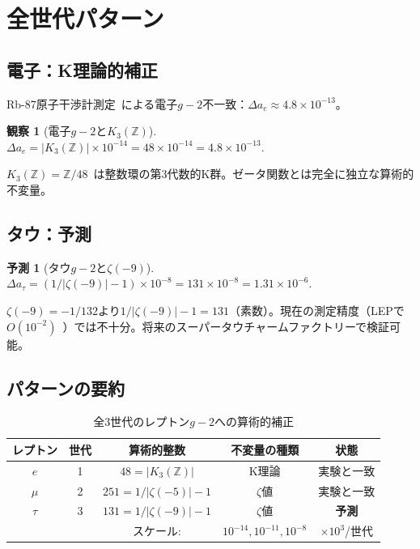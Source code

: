 \documentclass[11pt,a4paper]{article}
\newtheorem{observation}[theorem]{観察}
\newtheorem{prediction}[theorem]{予測}
\begin{document}
\section{全世代パターン}

\subsection{電子：K理論的補正}

Rb-87原子干渉計測定~\cite{Morel2020}による電子$g-2$不一致：$\Delta a_e \approx 4.8 \times 10^{-13}$。

\begin{observation}[電子$g-2$と$K_3(\mathbb{Z})$]
$\Delta a_e = |K_3(\mathbb{Z})| \times 10^{-14} = 48 \times 10^{-14} = 4.8 \times 10^{-13}.$
\end{observation}

$K_3(\mathbb{Z}) = \mathbb{Z}/48$~\cite{Lee1969}は整数環の第3代数的K群。ゼータ関数とは完全に独立な算術的不変量。

\subsection{タウ：予測}

\begin{prediction}[タウ$g-2$と$\zeta(-9)$]
$\Delta a_\tau = (1/|\zeta(-9)| - 1) \times 10^{-8} = 131 \times 10^{-8} = 1.31 \times 10^{-6}.$
\end{prediction}

$\zeta(-9) = -1/132$より$1/|\zeta(-9)| - 1 = 131$（素数）。現在の測定精度（LEPで$O(10^{-2})$~\cite{DELPHI2004}）では不十分。将来のスーパータウチャームファクトリーで検証可能。

\subsection{パターンの要約}

\begin{table}[h]
\centering
\caption{全3世代のレプトン$g-2$への算術的補正}
\begin{tabular}{@{}ccccc@{}}
\toprule
レプトン & 世代 & 算術的整数 & 不変量の種類 & 状態 \\
\midrule
$e$ & 1 & $48 = |K_3(\mathbb{Z})|$ & K理論 & 実験と一致 \\
$\mu$ & 2 & $251 = 1/|\zeta(-5)| - 1$ & $\zeta$値 & 実験と一致 \\
$\tau$ & 3 & $131 = 1/|\zeta(-9)| - 1$ & $\zeta$値 & \textbf{予測} \\
\midrule
& & スケール: & $10^{-14}, 10^{-11}, 10^{-8}$ & $\times 10^3$/世代 \\
\bottomrule
\end{tabular}
\end{table}
\end{document}
